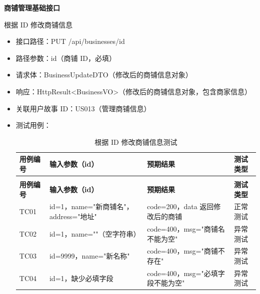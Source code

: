\begin{levellist}
    \item \textbf{商铺管理基础接口}
    \begin{levellist}
        \item 根据 ID 修改商铺信息
        \begin{itemize}
            \item 接口路径：PUT /api/businesses/{id}
            \item 路径参数：id（商铺 ID，必填）
            \item 请求体：BusinessUpdateDTO（修改后的商铺信息对象）
            \item 响应：HttpResult<BusinessVO>（修改后的商铺信息对象，包含商家信息）
            \item 关联用户故事 ID：US013（管理商铺信息）
            \item 测试用例：
                  \begin{longtable}{>{\centering\arraybackslash}m{2cm} >{\centering\arraybackslash}m{4cm} >{\centering\arraybackslash}m{5cm} >{\centering\arraybackslash}m{2cm}}

                      \caption{根据 ID 修改商铺信息测试} \label{tab:training}                                           \\

                      \toprule
                      \textbf{用例编号} & \textbf{输入参数（id）}             & \textbf{预期结果}           & \textbf{测试类型} \\
                      \midrule
                      \endfirsthead

                      \multicolumn{4}{c}{{\tablename\ \thetable{} 续表}}                                        \\
                      \toprule
                      \textbf{用例编号} & \textbf{输入参数（id）}             & \textbf{预期结果}           & \textbf{测试类型} \\
                      \midrule
                      \endhead

                      \bottomrule
                      \endfoot

                      TC01          & id=1，name="新商铺名"，address="地址" & code=200，data 返回修改后的商铺  & 正常测试          \\
                      TC02          & id=1，name=""（空字符串）            & code=400，msg="商铺名不能为空"  & 异常测试          \\
                      TC03          & id=9999，name="新名称"            & code=400，msg="商铺不存在"    & 异常测试          \\
                      TC04          & id=1，缺少必填字段                   & code=400，msg="必填字段不能为空" & 异常测试          \\
                  \end{longtable}
        \end{itemize}


\end{levellist}
\end{levellist}
